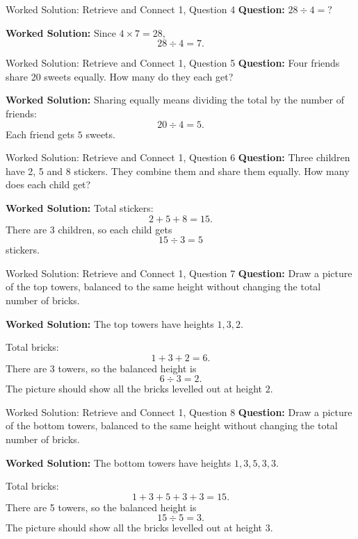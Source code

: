 \documentclass{beamer}
\begin{document}
\begin{frame}{Worked Solution: Retrieve and Connect 1, Question 4}
\textbf{Question:} \(28 \div 4 = ?\)

\textbf{Worked Solution:}
Since \(4 \times 7 = 28\),
\[
28 \div 4 = 7.
\]
\end{frame}

\begin{frame}{Worked Solution: Retrieve and Connect 1, Question 5}
\textbf{Question:} Four friends share 20 sweets equally. How many do they each get?

\textbf{Worked Solution:}
Sharing equally means dividing the total by the number of friends:
\[
20 \div 4 = 5.
\]
Each friend gets \(5\) sweets.
\end{frame}

\begin{frame}{Worked Solution: Retrieve and Connect 1, Question 6}
\textbf{Question:} Three children have 2, 5 and 8 stickers. They combine them and share them equally. How many does each child get?

\textbf{Worked Solution:}
Total stickers:
\[
2 + 5 + 8 = 15.
\]
There are 3 children, so each child gets
\[
15 \div 3 = 5
\]
stickers.
\end{frame}

\begin{frame}{Worked Solution: Retrieve and Connect 1, Question 7}
\textbf{Question:} Draw a picture of the top towers, balanced to the same height without changing the total number of bricks.

\textbf{Worked Solution:}
The top towers have heights \(1, 3, 2\).

Total bricks:
\[
1 + 3 + 2 = 6.
\]
There are 3 towers, so the balanced height is
\[
6 \div 3 = 2.
\]
The picture should show all the bricks levelled out at height \(2\).
\end{frame}

\begin{frame}{Worked Solution: Retrieve and Connect 1, Question 8}
\textbf{Question:} Draw a picture of the bottom towers, balanced to the same height without changing the total number of bricks.

\textbf{Worked Solution:}
The bottom towers have heights \(1, 3, 5, 3, 3\).

Total bricks:
\[
1 + 3 + 5 + 3 + 3 = 15.
\]
There are 5 towers, so the balanced height is
\[
15 \div 5 = 3.
\]
The picture should show all the bricks levelled out at height \(3\).
\end{frame}
\end{document}
